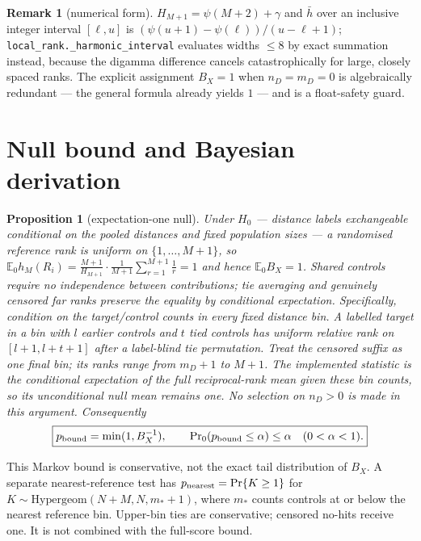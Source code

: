 \documentclass[10pt,a4paper]{article}
\newtheorem{proposition}{Proposition}
\theoremstyle{definition}
\newtheorem{remark}{Remark}
\newcommand{\E}{\mathbb{E}}
\newcommand{\code}[1]{\texttt{\small #1}}
\begin{document}
\begin{remark}[numerical form]
$H_{M+1}=\psi(M+2)+\gamma$ and $\bar h$ over an inclusive integer interval $[\ell,u]$ is
$(\psi(u+1)-\psi(\ell))/(u-\ell+1)$; \code{local\_rank.\_harmonic\_interval} evaluates widths
$\le8$ by exact summation instead, because the digamma difference cancels catastrophically for
large, closely spaced ranks. The explicit assignment $B_X\!=\!1$ when $n_D=m_D=0$ is algebraically
redundant --- the general formula already yields $1$ --- and is a float-safety guard.
\end{remark}

\section{Null bound and Bayesian derivation}
\begin{proposition}[expectation-one null]\label{prop:null}
Under $H_0$ --- distance labels exchangeable conditional on the pooled distances and fixed
population sizes --- a randomised reference rank is uniform on $\{1,\dots,M+1\}$, so
$\E_0h_M(R_i)=\frac{M+1}{H_{M+1}}\cdot\frac{1}{M+1}\sum_{r=1}^{M+1}\frac1r=1$ and hence
$\E_0B_X=1$. Shared controls require no independence between contributions; tie averaging and
genuinely censored far ranks preserve the equality by conditional expectation.
Specifically, condition on the target/control counts in every fixed distance bin. A labelled target
in a bin with $l$ earlier controls and $t$ tied controls has uniform relative rank on
$[l+1,l+t+1]$ after a label-blind tie permutation. Treat the censored suffix as one final bin;
its ranks range from $m_D+1$ to $M+1$. The implemented statistic is the conditional expectation
of the full reciprocal-rank mean given these bin counts, so its unconditional null mean remains one.
No selection on $n_D>0$ is made in this argument. Consequently
\[
\boxed{p_{\rm bound}=\min(1,B_X^{-1}),\qquad \Pr\nolimits_0(p_{\rm bound}\le\alpha)\le\alpha\quad(0<\alpha<1).}
\]
\end{proposition}
This Markov bound is conservative, not the exact tail distribution of $B_X$. A separate
nearest-reference test has $p_{\rm nearest}=\Pr\{K\ge1\}$ for
$K\sim\mathrm{Hypergeom}(N+M,N,m_*+1)$, where $m_*$ counts controls at or below the nearest
reference bin. Upper-bin ties are conservative; censored no-hits receive one. It is not combined
with the full-score bound.
\end{document}
